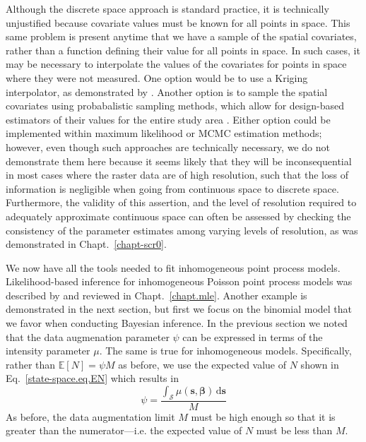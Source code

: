 Although the discrete space approach is standard practice, it is
technically unjustified because covariate values must be known for all
points in space. This same problem is present anytime that we have a
sample of the spatial covariates, rather than a function defining
their value for all points in space. In such cases, it may be necessary to
interpolate the values of the covariates for points in space where
they were not measured. One option would be to use a Kriging
interpolator, as demonstrated by \citet{rathbun:1996}. Another option
is to sample the spatial covariates using probabalistic sampling
methods, which allow for design-based estimators of their values for
the entire study area \citep{rathbun_etal:2007}. Either option could
be implemented within maximum likelihood or MCMC estimation methods; however, even though such
approaches are technically necessary, we do not demonstrate them here
because it seems likely that they will be inconsequential in most
cases where the raster data are of high resolution, such that the loss
of information is negligible when going from continuous space to
discrete space. Furthermore, the validity of this assertion, and the
level of resolution required to adequately approximate continuous
space can often be assessed by checking the consistency of the
parameter estimates among varying levels of resolution, as was
demonstrated in Chapt.~\ref{chapt-scr0}.

We now have all the tools needed to fit inhomogeneous point process
models. Likelihood-based inference for inhomogeneous Poisson point
process models was described by \citet{borchers_efford:2008} and
reviewed in Chapt.~\ref{chapt.mle}. Another example is demonstrated in
the next section, but first we focus on the binomial
model that we favor when conducting Bayesian inference. In the
previous section we noted that the data augmenation parameter $\psi$
can be expressed in terms of the intensity parameter $\mu$. The same
is true for inhomogeneous models. Specifically, rather than
$\mathbb{E}[N] = \psi M$ as before, we use the expected value of $N$ shown
in Eq.~\ref{state-space.eq.EN} which results in
\begin{equation}
\psi = \frac{\int_{\mathcal{S}} \mu(\mathbf{s},
  \bm{\beta}) \, \mathrm{d}\mathbf{s}}{M}
\label{state-space.eq.psimu}
\end{equation}
As before, the data augmentation limit $M$ must be high enough so that
it is greater than the numerator---i.e. the expected value
of $N$ must be less than $M$.

